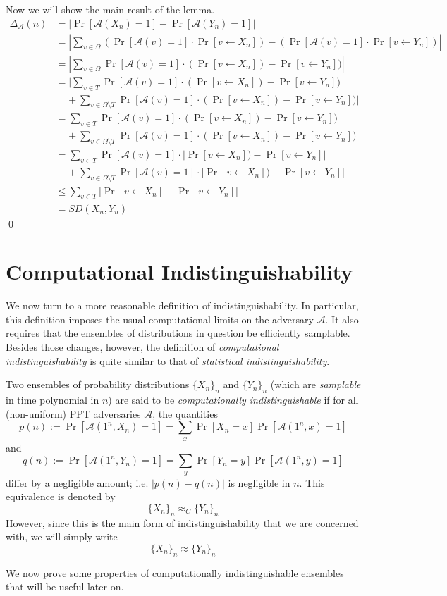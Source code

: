 \documentclass[12pt]{tufte-book}
\newcommand{\ma}{\mathcal{A}}
\begin{document}
Now we will show the main result of the lemma.
\begin{align*}
    \Delta_\ma(n) &= |\Pr[\ma(X_n) = 1] - \Pr[\ma(Y_n) = 1]| \\
    &= |\sum\limits_{v \in \Omega} (\Pr[\ma(v) = 1] \cdot \Pr[v \leftarrow X_n]) - (\Pr[\ma(v) = 1] \cdot \Pr[v \leftarrow Y_n])|\\
    &= |\sum\limits_{v \in \Omega} \Pr[\ma(v) = 1] \cdot ( \Pr[v \leftarrow X_n]) - \Pr[v \leftarrow Y_n])| \\
    &= |\sum\limits_{v \in T} \Pr[\ma(v) = 1] \cdot ( \Pr[v \leftarrow X_n]) - \Pr[v \leftarrow Y_n]) \\
    &\;\;\;\; + \sum\limits_{v \in \Omega \setminus T} \Pr[\ma(v) = 1] \cdot ( \Pr[v \leftarrow X_n]) - \Pr[v \leftarrow Y_n])| \\
    &= \sum\limits_{v \in T} \Pr[\ma(v) = 1] \cdot ( \Pr[v \leftarrow X_n]) - \Pr[v \leftarrow Y_n]) \\
    &\;\;\;\; + \sum\limits_{v \in \Omega \setminus T} \Pr[\ma(v) = 1] \cdot ( \Pr[v \leftarrow X_n]) - \Pr[v \leftarrow Y_n]) \\
    &= \sum\limits_{v \in T} \Pr[\ma(v) = 1] \cdot |\Pr[v \leftarrow X_n]) - \Pr[v \leftarrow Y_n]| \\
    &\;\;\;\; + \sum\limits_{v \in \Omega \setminus T} \Pr[\ma(v) = 1] \cdot |\Pr[v \leftarrow X_n]) - \Pr[v \leftarrow Y_n]| \\
    &\le \sum\limits_{v \in T} |\Pr[v \leftarrow X_n] - \Pr[v \leftarrow Y_n]|\\
    &= SD(X_n, Y_n)
\end{align*}
\qed

\section{Computational Indistinguishability}
We now turn to a more reasonable definition of indistinguishability.
In particular, this definition imposes the usual computational limits on the adversary $\ma$. 
It also requires that the ensembles of distributions in question be efficiently samplable.
Besides those changes, however, the definition of \emph{computational indistinguishability} is quite similar to that of \emph{statistical indistinguishability}.

\begin{definition}
Two ensembles of probability distributions $\{X_n\}_n$ and $\{Y_n\}_n$ (which are \emph{samplable} in time polynomial in $n$) are said to be \emph{computationally indistinguishable} if for all (non-uniform) PPT adversaries $\ma$, the quantities
$$p(n) := \Pr[\ma(1^n, X_n) = 1] = \sum_x \Pr[X_n = x]\Pr[\ma(1^n,x) = 1]$$
and
$$q(n) := \Pr[\ma(1^n,Y_n) = 1] = \sum_y \Pr[Y_n = y]\Pr[\ma(1^n,y) = 1]$$
differ by a negligible amount; i.e. $|p(n) - q(n)|$ is negligible in $n$.    
This equivalence is denoted by
$$\{X_n\}_n\approx_C \{Y_n\}_n$$
However, since this is the main form of indistinguishability that we are concerned with, we will simply write
$$\{X_n\}_n\approx \{Y_n\}_n$$
\end{definition}
We now prove some properties of computationally indistinguishable ensembles that will be useful later on.
\end{document}
